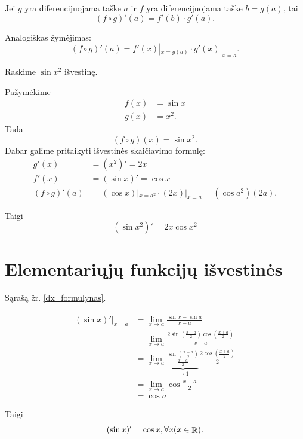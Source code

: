 \begin{prop}
  Jei $g$ yra diferencijuojama taške $a$ ir $f$ yra diferencijuojama 
  taške $b = g(a)$, tai
  \begin{equation*}
    (f \circ g)'(a) = f'(b) \cdot g'(a).
  \end{equation*}

  Analogiškas žymėjimas:
  \begin{equation*}
    (f \circ g)'(a) = f'(x)|_{x = g(a)} \cdot g'(x)|_{x = a}.
  \end{equation*}
\end{prop}

\begin{exmp}
  Raskime $\sin x^{2}$ išvestinę.

  Pažymėkime
  \begin{align*}
    f(x) &= \sin x \\
    g(x) &= x^{2}.
  \end{align*}
  Tada 
  \begin{equation*}
    (f \circ g)(x) = \sin x^{2}.
  \end{equation*}
  Dabar galime pritaikyti išvestinės skaičiavimo formulę:
  \begin{align*}
    g'(x) &= (x^{2})' = 2x \\
    f'(x) &= (\sin x)' = \cos x \\
    (f \circ g)'(a) &= (\cos x)|_{x = a^{2}} \cdot (2x)|_{x=a} 
      = (\cos a^2)(2a).
  \end{align*}

  Taigi
  \begin{equation*}
    (\sin x^{2})' = 2x \cos x^{2}
  \end{equation*}

\end{exmp}

\section{Elementariųjų funkcijų išvestinės}

Sąrašą žr. \ref{dx_formulynas}.

\begin{exmp}
  \begin{align*}
    (\sin x)'|_{x=a}
    &= \lim _{x \to a} \frac{\sin x - \sin a}{x - a} \\
    &= \lim _{x \to a} \frac{
      2 \sin \left( \frac{x - a}{2} \right) 
      \cos \left( \frac{x + a}{2} \right)
      }{x - a} \\
    &= \lim _{x \to a} 
      \underbrace{
        \frac{\sin \left( \frac{x - a}{2} \right)}{\frac{x - a}{2}}
      }_{\to 1}
      \frac{2 \cos \left( \frac{x + a}{2} \right)}{2} \\
      &= \lim _{x \to a} \cos \frac{x + a}{2} \\
      &= \cos a
  \end{align*}

  Taigi
  \begin{equation*}
    (\sin x)' = \cos x, \forall x (x \in \mathop{\mathbb{R}}).
  \end{equation*}
\end{exmp}

